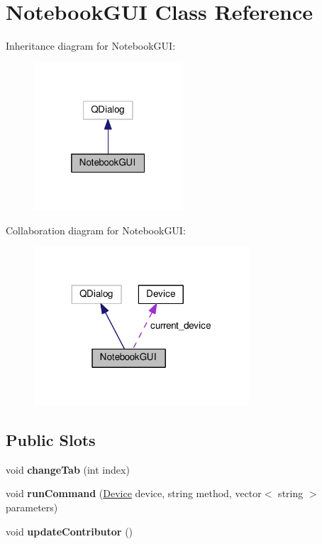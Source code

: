 \hypertarget{classNotebookGUI}{}\section{Notebook\+G\+UI Class Reference}
\label{classNotebookGUI}


Inheritance diagram for Notebook\+G\+UI\+:\nopagebreak
\begin{figure}[H]
\begin{center}
\leavevmode
\includegraphics[width=157pt]{classNotebookGUI__inherit__graph}
\end{center}
\end{figure}


Collaboration diagram for Notebook\+G\+UI\+:\nopagebreak
\begin{figure}[H]
\begin{center}
\leavevmode
\includegraphics[width=227pt]{classNotebookGUI__coll__graph}
\end{center}
\end{figure}
\subsection*{Public Slots}
\begin{DoxyCompactItemize}
\item 
\mbox{\label{classNotebookGUI_a884a0fcff797d5e04c649417b813bde6}} 
void {\bfseries change\+Tab} (int index)
\item 
\mbox{\label{classNotebookGUI_a7ff25fc8ea4287bd42d2e4deae59a65a}} 
void {\bfseries run\+Command} (\hyperlink{classDevice}{Device} device, string method, vector$<$ string $>$ parameters)
\item 
\mbox{\label{classNotebookGUI_a3d367714a753d3bd1d6cdbc1a04a260a}} 
void {\bfseries update\+Contributor} ()
\end{DoxyCompactItemize}
